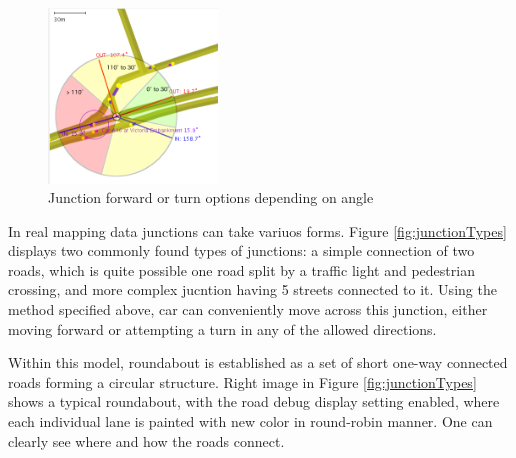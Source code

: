 \begin{figure}[h]
    \caption{Junction forward or turn options depending on angle }
    \label{fig:forwardOrTurnOption}
    \centering
    \includegraphics[width=0.4\textwidth]{figs/junction/junction_car_incoming_angle_with_turn_sectors.png}
\end{figure}

In real mapping data junctions can take variuos forms. Figure \ref{fig:junctionTypes} displays two commonly found types of junctions: a simple connection of two roads, which is quite possible one road split by a traffic light and pedestrian crossing, and more complex jucntion having 5 streets connected to it. Using the method specified above, car can conveniently move across this junction, either moving forward or attempting a turn in any of the allowed directions.

Within this model, roundabout is established as a set of short one-way connected roads forming a circular structure. Right image in Figure \ref{fig:junctionTypes} shows a typical roundabout, with the road debug display setting enabled, where each individual lane is painted with new color in round-robin manner. One can clearly see where and how the roads connect.

